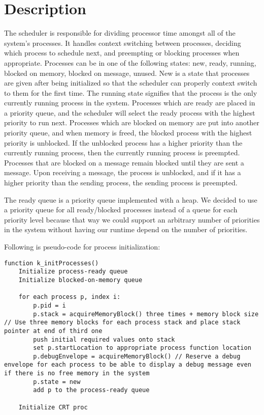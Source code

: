 \documentclass[12pt]{report}
\begin{document}
\section{Description}
The scheduler is responsible for dividing processor time amongst all of the system's processes. It handles context switching between processes, deciding which process to schedule next, and preempting or blocking processes when appropriate. Processes can be in one of the following states: new, ready, running, blocked on memory, blocked on message, unused. New is a state that processes are given after being initialized so that the scheduler can properly context switch to them for the first time. The running state signifies that the process is the only currently running process in the system. Processes which are ready are placed in a priority queue, and the scheduler will select the ready process with the highest priority to run next. Processes which are blocked on memory are put into another priority queue, and when memory is freed, the blocked process with the highest priority is unblocked. If the unblocked process has a higher priority than the currently running process, then the currently running process is preempted. Processes that are blocked on a message remain blocked until they are sent a message. Upon receiving a message, the process is unblocked, and if it has a higher priority than the sending process, the sending process is preempted.

The ready queue is a priority queue implemented with a heap. We decided to use a priority queue for all ready/blocked processes instead of a queue for each priority level because that way we could support an arbitrary number of priorities in the system without having our runtime depend on the number of priorities.

Following is pseudo-code for process initialization:
\begin{lstlisting}
function k_initProcesses()
    Initialize process-ready queue
    Initialize blocked-on-memory queue

    for each process p, index i:
        p.pid = i
        p.stack = acquireMemoryBlock() three times + memory block size // Use three memory blocks for each process stack and place stack pointer at end of third one
        push initial required values onto stack
        set p.startLocation to appropriate process function location
        p.debugEnvelope = acquireMemoryBlock() // Reserve a debug envelope for each process to be able to display a debug message even if there is no free memory in the system
        p.state = new
        add p to the process-ready queue

    Initialize CRT proc
\end{lstlisting}
\end{document}
